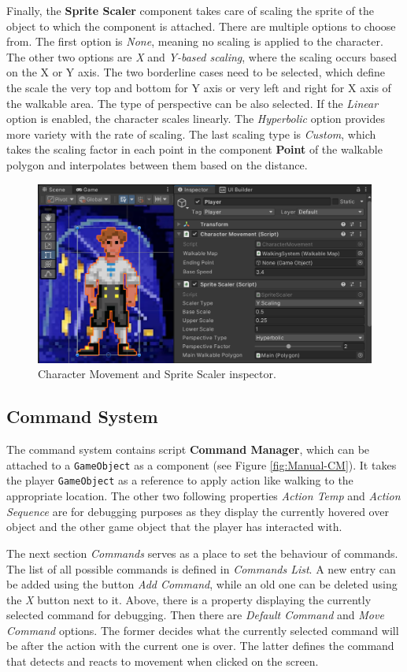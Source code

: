 Finally, the \textbf{Sprite Scaler} component takes care of scaling the sprite of the object to which the component is attached. There are multiple options to choose from. The first option is \textit{None}, meaning no scaling is applied to the character. The other two options are \textit{X }and \textit{Y-based scaling}, where the scaling occurs based on the X or Y axis. The two borderline cases need to be selected, which define the scale the very top and bottom for Y axis or very left and right for X axis of the walkable area. The type of perspective can be also selected. If the \textit{Linear} option is enabled, the character scales linearly. The \textit{Hyperbolic} option provides more variety with the rate of scaling. The last scaling type is \textit{Custom}, which takes the scaling factor in each point in the component \textbf{Point} of the walkable polygon and interpolates between them based on the distance.
\begin{figure}[H]
\centering
\includegraphics[width=0.8\linewidth]{img/User doc/character_movement.png}
\caption{Character Movement and Sprite Scaler inspector.}
\label{fig:Manual-ChM&SS}
\end{figure}

\subsection{Command System}
The command system contains script \textbf{Command Manager}, which can be attached to a \verb|GameObject| as a component (see Figure \ref{fig:Manual-CM}). It takes the player \verb|GameObject| as a reference to apply action like walking to the appropriate location. The other two following properties \textit{Action Temp} and \textit{Action Sequence} are for debugging purposes as they display the currently hovered over object and the other game object that the player has interacted with.

The next section \textit{Commands} serves as a place to set the behaviour of commands. The list of all possible commands is defined in \textit{Commands List}. A new entry can be added using the button \textit{Add Command}, while an old one can be deleted using the \textit{X} button next to it. Above, there is a property displaying the currently selected command for debugging. Then there are \textit{Default Command} and \textit{Move Command} options. The former decides what the currently selected command will be after the action with the current one is over. The latter defines the command that detects and reacts to movement when clicked on the screen.

